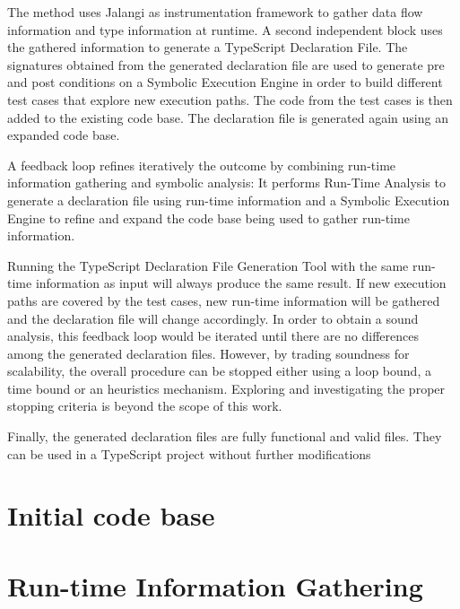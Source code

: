 The method uses Jalangi as instrumentation framework to gather data flow information and type information at runtime. A second independent block uses the gathered information to generate a TypeScript Declaration File. The signatures obtained from the generated declaration file are used to generate pre and post conditions on a Symbolic Execution Engine in order to build different test cases that explore new execution paths. The code from the test cases is then added to the existing code base. The declaration file is generated again using an expanded code base.

A feedback loop refines iteratively the outcome by combining run-time information gathering and symbolic analysis: It performs Run-Time Analysis to generate a declaration file using run-time information and a Symbolic Execution Engine to refine and expand the code base being used to gather run-time information.

Running the TypeScript Declaration File Generation Tool with the same run-time information as input will always produce the same result. If new execution paths are covered by the test cases, new run-time information will be gathered and the declaration file will change accordingly. In order to obtain a sound analysis, this feedback loop would be iterated until there are no differences among the generated declaration files. However, by trading soundness for scalability, the overall procedure can be stopped either using a loop bound, a time bound or an heuristics mechanism. Exploring and investigating the proper stopping criteria is beyond the scope of this work.  

Finally, the generated declaration files are fully functional and valid files. They can be used in a TypeScript project without further modifications



\section{Initial code base}

\section{Run-time Information Gathering} \label{run-time-information-gathering}
